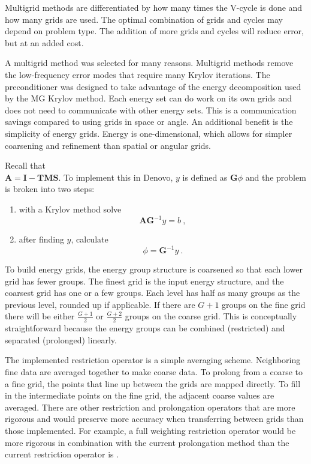 \documentclass[preprint,12pt]{elsarticle}
\newcommand{\ve}[1]{\ensuremath{\mathbf{#1}}}
\begin{document}
Multigrid methods are differentiated by how many times the V-cycle is done and how many grids are used. The optimal combination of grids and cycles may depend on problem type. The addition of more grids and cycles will reduce error, but at an added cost.
 
A multigrid method was selected for many reasons. Multigrid methods remove the low-frequency error modes that require many Krylov iterations. The preconditioner was designed to take advantage of the energy decomposition used by the MG Krylov method. Each energy set can do work on its own grids and does not need to communicate with other energy sets. This is a communication savings compared to using grids in space or angle. An additional benefit is the simplicity of energy grids. Energy is one-dimensional, which allows for simpler coarsening and refinement than spatial or angular grids.

Recall that \\$\ve{A} = \ve{I} - \ve{TMS}$. To implement this in Denovo, $y$ is defined as $\ve{G}\phi$ and the problem is broken into two steps: 
%
\begin{enumerate}
  \item with a Krylov method solve 
    \begin{equation}
      \ve{AG}^{-1}y = b \:, \label{eq:PrecondKrylov} 
    \end{equation}
  \item after finding $y$, calculate 
    \begin{equation}
      \phi = \ve{G}^{-1}y \:. \label{eq:PrecondPhi}
    \end{equation}
\end{enumerate}

To build energy grids, the energy group structure is coarsened so that each lower grid has fewer groups. The finest grid is the input energy structure, and the coarsest grid has one or a few groups. Each level has half as many groups as the previous level, rounded up if applicable. If there are $G+1$ groups on the fine grid there will be either $\frac{G+1}{2}$ or $\frac{G+2}{2}$ groups on the coarse grid. This is conceptually straightforward because the energy groups can be combined (restricted) and separated (prolonged) linearly.

The implemented restriction operator is a simple averaging scheme. Neighboring fine data are averaged together to make coarse data. To prolong from a coarse to a fine grid, the points that line up between the grids are mapped directly. To fill in the intermediate points on the fine grid, the adjacent coarse values are averaged. There are other restriction and prolongation operators that are more rigorous and would preserve more accuracy when transferring between grids than those implemented. For example, a full weighting restriction operator would be more rigorous in combination with the current prolongation method than the current restriction operator is \cite{Briggs2000}.
\end{document}
